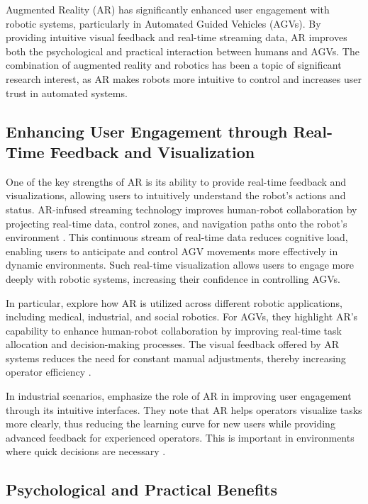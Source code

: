 Augmented Reality (AR) has significantly enhanced user engagement with robotic systems, particularly in Automated Guided Vehicles (AGVs). By providing intuitive visual feedback and real-time streaming data, AR improves both the psychological and practical interaction between humans and AGVs. The combination of augmented reality and robotics has been a topic of significant research interest, as AR makes robots more intuitive to control and increases user trust in automated systems.

\subsection{Enhancing User Engagement through Real-Time Feedback and Visualization}

One of the key strengths of AR is its ability to provide real-time feedback and visualizations, allowing users to intuitively understand the robot’s actions and status. AR-infused streaming technology improves human-robot collaboration by projecting real-time data, control zones, and navigation paths onto the robot's environment \cite{Fu2023}. This continuous stream of real-time data reduces cognitive load, enabling users to anticipate and control AGV movements more effectively in dynamic environments. Such real-time visualization allows users to engage more deeply with robotic systems, increasing their confidence in controlling AGVs.

In particular, \cite{Fu2023} explore how AR is utilized across different robotic applications, including medical, industrial, and social robotics. For AGVs, they highlight AR's capability to enhance human-robot collaboration by improving real-time task allocation and decision-making processes. The visual feedback offered by AR systems reduces the need for constant manual adjustments, thereby increasing operator efficiency \cite{Fu2023}.

In industrial scenarios, \cite{Makhataeva2020} emphasize the role of AR in improving user engagement through its intuitive interfaces. They note that AR helps operators visualize tasks more clearly, thus reducing the learning curve for new users while providing advanced feedback for experienced operators. This is important in environments where quick decisions are necessary \cite{Makhataeva2020}.

\subsection{Psychological and Practical Benefits}

